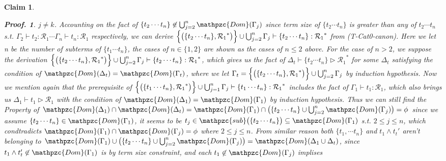 \documentclass[12pt]{article}
\newtheorem{Claim}{Claim}[section]
\newtheorem{Proof}{Proof.}
\begin{document}
\begin{Claim}
\begin{Proof}
    $j \neq k$. Accounting on the fact of
    $\{t_2 \cdots t_n\} \not\in \bigcup_{j=2}^n\mathpzc{Dom}(\Gamma_j)$
    since term size of $\{t_2 \cdots t_n\}$ is greater than any of
    $t_2 \cdots t_n$ s.t. $\Gamma_2 \vdash t_2: \mathcal{R}_1 \cdots
    \Gamma_n \vdash t_n: \mathcal{R}_1$ respectively, we can derive
    $\Bigl\{\bigl(\{t_2 \cdots t_n\}, {\mathcal{R}_1}^* \bigr) \Bigr\} \cup
    \bigcup_{j=2}^n\Gamma_j \vdash \{t_2 \cdots t_n\}: {\mathcal{R}_1}^*$
    from (T-Cat0-canon). Here we let n be the number of subterms of
    $\{t_1 \cdots t_n\}$, the cases of $n \in \{1, 2\}$ are shown as the
    cases of $n \le 2$ above.
    For the case of $n > 2$, we suppose the derivation
    $\Bigl\{\bigl(\{t_2 \cdots t_n\}, {\mathcal{R}_1}^* \bigr) \Bigr\} \cup
    \bigcup_{j=2}^n\Gamma_j \vdash \{t_2 \cdots t_n\}: {\mathcal{R}_1}^*$,
    which gives us the fact of
    $\Delta_t \vdash \{t_2 \cdots t_n\} \triangleright {\mathcal{R}_1}^*$
    for some $\Delta_t$ satisfying the condition of
    $\mathpzc{Dom}(\Delta_t) = \mathpzc{Dom}(\Gamma_t)$, where we let
    $\Gamma_t = \Bigl\{\bigl(\{t_2 \cdots t_n\}, {\mathcal{R}_1}^* \bigr)
    \Bigr\} \cup \bigcup_{j=2}^n\Gamma_j$ by induction hypothesis. Now
    we mention again that the prerequisite of
    $\Bigl\{\bigl(\{t_1 \cdots t_n\}, {\mathcal{R}_1}^* \bigr) \Bigr\} \cup
    \bigcup_{j=1}^n\Gamma_j  \vdash \{t_1 \cdots t_n\}: {\mathcal{R}_1}^*$
    includes the fact of $\Gamma_1 \vdash t_1 : \mathcal{R}_1$, 
    which also brings us $\Delta_1 \vdash t_1 \triangleright \mathcal{R}_1$
    with the condition of
    $\mathpzc{Dom}(\Delta_1) = \mathpzc{Dom}(\Gamma_1)$ by
    induction hypothesis. Thus we can still find the Property of
    $\mathpzc{Dom}(\Delta_1) \cap \mathpzc{Dom}(\Delta_t) =
    \mathpzc{Dom}(\Gamma_1) \cap
    \bigl(\{t_2 \cdots t_n\} \cup \bigcup_{j=2}^n\mathpzc{Dom}(\Gamma_j)
    \bigr) = \phi$ since we assume
    $\{t_2 \cdots t_n\} \in \mathpzc{Dom}(\Gamma_1)$, it seems to be
    $t_j \in \mathpzc{sub}\bigl(\{t_2 \cdots t_n\} \bigr) \subseteq
    \mathpzc{Dom}(\Gamma_1)$ s.t. $2 \le j \le n$, which condtradicts
    $\mathpzc{Dom}(\Gamma_1) \cap \mathpzc{Dom}(\Gamma_j) = \phi$ where
    $2 \le j \le n$.
    From similar reason both $\{t_1, \cdots t_n\}$ and $t_1 \wedge t_t'$
    aren't belonging to $\mathpzc{Dom}(\Gamma_1) \cup \bigl(\{t_2 \cdots t_n\} 
    \cup \bigcup_{j=2}^n\mathpzc{Dom}(\Gamma_j) \bigr) =
    \mathpzc{Dom}(\Delta_1 \cup \Delta_t)$, since
    $t_1 \wedge t_t' \not\in \mathpzc{Dom}(\Gamma_1)$ is by term size
    constraint, and each $t_1 \not\in \mathpzc{Dom}(\Gamma_j)$ implises

\end{Proof}
\end{Claim}
\end{document}

